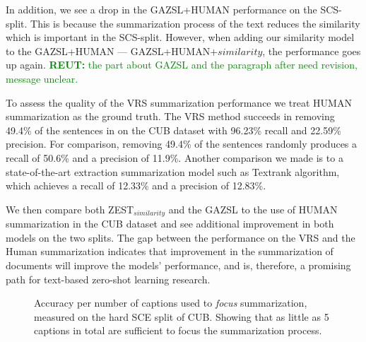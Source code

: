 \documentclass[11pt,a4paper]{article}
\newcommand\yuval[1]{\textcolor{darkpink}{\textbf{YUVAL:} #1 }}
\newcommand\reut[1]{\textcolor{green}{\textbf{REUT:} #1 }}
\begin{document}
In addition, we see a drop in the GAZSL+HUMAN performance on the SCS-split. This is because the summarization process of the text reduces the similarity which is important in the SCS-split. However, when adding our similarity model to the GAZSL+HUMAN --- GAZSL+HUMAN+$similarity$,  the performance goes up again.
\reut{the part about GAZSL and the  paragraph after need revision, message unclear.} 

To assess the quality of the VRS summarization performance we treat HUMAN summarization as the ground truth. The VRS method succeeds in removing 49.4\% of the sentences in on the CUB dataset with 96.23\% recall and 22.59\% precision. For comparison, removing 49.4\% of the sentences randomly produces a recall of 50.6\% and a precision of 11.9\%.
Another comparison we made is to a state-of-the-art extraction summarization model such as  Textrank \citep{mihalcea2004textrank} algorithm, which achieves a recall of 12.33\% and a precision of 12.83\%.

 
We then compare both ZEST$_{similarity}$ and the GAZSL to the use of HUMAN summarization in the CUB dataset and see additional improvement in both models on the two splits. The gap between the performance on the VRS and the Human summarization indicates that improvement in the summarization of documents will improve the models' performance, and is, therefore, a promising path for text-based zero-shot learning research.


\begin{figure}[t]
\centering
{}
 \caption{Accuracy per number of captions used to \textit{focus}   summarization, measured on the hard SCE split of CUB. Showing that as little as 5 captions in total are sufficient to focus the summarization process.
 }
\label{fig:captions}
\end{figure}
\end{document}
